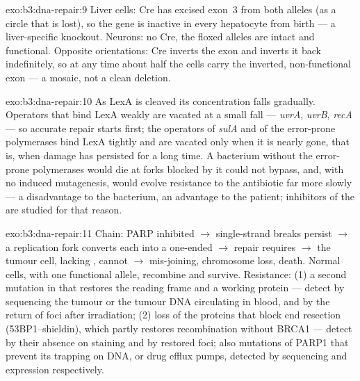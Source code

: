 \begin{solution}{exo:b3:dna-repair:9}
Liver cells: Cre has excised exon~3 from both alleles (as a circle
that is lost), so the gene is inactive in every hepatocyte from birth
--- a liver-specific knockout. Neurons: no Cre, the floxed alleles
are intact and functional. Opposite orientations: Cre inverts the
exon and inverts it back indefinitely, so at any time about half the
cells carry the inverted, non-functional exon --- a mosaic, not a clean
deletion.
\end{solution}

\begin{solution}{exo:b3:dna-repair:10}
As LexA is cleaved its concentration falls gradually. Operators that
bind LexA weakly are vacated at a small fall --- \emph{uvrA},
\emph{uvrB}, \emph{recA} --- so accurate repair starts first; the
operators of \emph{sulA} and of the error-prone polymerases bind LexA
tightly and are vacated only when it is nearly gone, that is, when
damage has persisted for a long time. A bacterium without the
error-prone polymerases would die at forks blocked by  it could
not bypass, and, with no induced mutagenesis, would evolve resistance
to the antibiotic far more slowly --- a disadvantage to the bacterium,
an advantage to the patient; inhibitors of the  are
studied for that reason.
\end{solution}

\begin{solution}{exo:b3:dna-repair:11}
Chain: PARP inhibited $\to$ single-strand breaks persist $\to$ a
replication fork converts each into a one-ended 
$\to$ repair requires  $\to$ the tumour cell,
lacking , cannot $\to$ mis-joining, chromosome loss, death. Normal
cells, with one functional allele, recombine and survive. Resistance:
(1) a second mutation in \emph{} that restores the reading frame
and a working protein --- detect by sequencing the tumour or the
tumour DNA circulating in blood, and by the return of  foci after
irradiation; (2) loss of the proteins that block end resection
(53BP1--shieldin), which partly restores recombination without BRCA1
--- detect by their absence on staining and by restored  foci;
also mutations of PARP1 that prevent its trapping on DNA, or drug
efflux pumps, detected by sequencing and expression respectively.
\end{solution}

